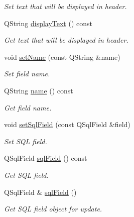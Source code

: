\begin{DoxyCompactItemize}
\begin{DoxyCompactList}\small\item\em Set text that will be displayed in header. \end{DoxyCompactList}\item 
\hypertarget{classmdt_field_map_field_a3ee55b810bd6127bb88a32a7c753b1e7}{
QString \hyperlink{classmdt_field_map_field_a3ee55b810bd6127bb88a32a7c753b1e7}{displayText} () const }
\label{classmdt_field_map_field_a3ee55b810bd6127bb88a32a7c753b1e7}

\begin{DoxyCompactList}\small\item\em Get text that will be displayed in header. \end{DoxyCompactList}\item 
void \hyperlink{classmdt_field_map_field_adaf71b43697a9239907d142385125b10}{setName} (const QString \&name)
\begin{DoxyCompactList}\small\item\em Set field name. \end{DoxyCompactList}\item 
QString \hyperlink{classmdt_field_map_field_ab9d17f7703f24baad1e3932978fde338}{name} () const 
\begin{DoxyCompactList}\small\item\em Get field name. \end{DoxyCompactList}\item 
\hypertarget{classmdt_field_map_field_a11b5595b1eed08f9136640d9cbe5e978}{
void \hyperlink{classmdt_field_map_field_a11b5595b1eed08f9136640d9cbe5e978}{setSqlField} (const QSqlField \&field)}
\label{classmdt_field_map_field_a11b5595b1eed08f9136640d9cbe5e978}

\begin{DoxyCompactList}\small\item\em Set SQL field. \end{DoxyCompactList}\item 
\hypertarget{classmdt_field_map_field_a1b168eb4dab3157936d520fb7ad38b76}{
QSqlField \hyperlink{classmdt_field_map_field_a1b168eb4dab3157936d520fb7ad38b76}{sqlField} () const }
\label{classmdt_field_map_field_a1b168eb4dab3157936d520fb7ad38b76}

\begin{DoxyCompactList}\small\item\em Get SQL field. \end{DoxyCompactList}\item 
\hypertarget{classmdt_field_map_field_a955292b902bb21f14f1c0226b084c7cb}{
QSqlField \& \hyperlink{classmdt_field_map_field_a955292b902bb21f14f1c0226b084c7cb}{sqlField} ()}
\label{classmdt_field_map_field_a955292b902bb21f14f1c0226b084c7cb}

\begin{DoxyCompactList}\small\item\em Get SQL field object for update. \end{DoxyCompactList}\end{DoxyCompactItemize}
